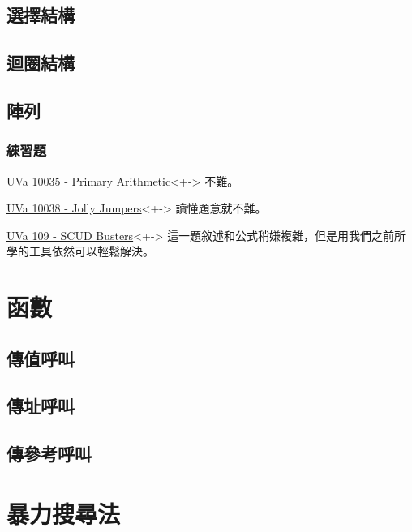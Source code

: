 \documentclass[utf8]{beamer}
\begin{document}
\begin{CJK}{UTF8}{bkai}
\subsection{選擇結構}
\subsection{迴圈結構}
\subsection{陣列}

\begin{frame}
  \frametitle{練習題}
  \begin{exampleblock}{\href{http://unfortunate-dog.github.io/articles/100/p10035/}{UVa 10035 - Primary Arithmetic}}<+->
  \label{uva:10035}
  不難。
  \end{exampleblock}
  \begin{exampleblock}{\href{http://unfortunate-dog.github.io/articles/100/p10038/}{UVa 10038 - Jolly Jumpers}}<+->
  \label{uva:10038}
  讀懂題意就不難。
  \end{exampleblock}
  \begin{exampleblock}{\href{http://unfortunate-dog.github.io/articles/1/p109/}{UVa 109 - SCUD Busters}}<+->
  \label{uva:591}
  這一題敘述和公式稍嫌複雜，但是用我們之前所學的工具依然可以輕鬆解決。
  \end{exampleblock}
\end{frame}

\section{函數}

\subsection{傳值呼叫}

\subsection{傳址呼叫}

\subsection{傳參考呼叫}

\section{暴力搜尋法}

\clearpage
\end{CJK}
\end{document}
